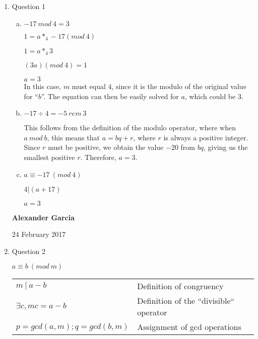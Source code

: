 \documentclass[11pt]{article}
\begin{document}
\begin{enumerate}

	\item Question 1

		\begin{enumerate}[(a)]

			\item $-17\ mod\ 4 = 3$

			$1 = a *_4 -17 (mod\ 4)$

			$1 = a * _4 3$

			$(3a)(mod\ 4) = 1$

			$a = 3$\\

			In this case, $m$ must equal $4$, since it is the modulo of the original value for
			``$b$''. The equation can then be easily solved for $a$, which could be 3. \\

			\item $-17 \div 4 = -5\ rem\ 3$

			This follows from the definition of the modulo operator, where when $a\ mod\ b$,
			this means that $a = bq + r$, where $r$ is always a positive integer. Since $r$ must
			be positive, we obtain the value $-20$ from $bq$, giving us the smallest positive $r$.
			Therefore, $a = 3$. \\

			\item $a \equiv -17\ (mod\ 4)$

			$4 | (a+17)$

			$a = 3$ \\

		\end{enumerate}

	\newpage

	\textbf{Alexander Garcia}	

	24 February 2017

	\item Question 2
		
		$a \equiv b\ (mod\ m)$ 

		\begin{tabular}{ll}
			$m\ |\ a-b$ & Definition of congruency \\

			$\exists c, mc = a-b$ & Definition of the ``divisible`` operator \\ 

			$p = gcd(a,m); q = gcd(b,m)$ & Assignment of gcd operations \\


\end{tabular}
\end{enumerate}
\end{document}
